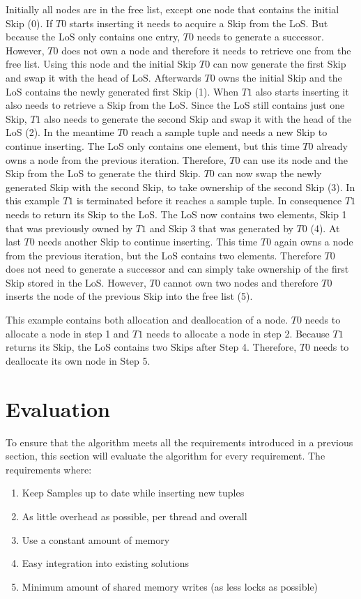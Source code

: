 \documentclass[sigconf,nonacm]{acmart}
\begin{document}
        Initially all nodes are in the free list, except one node that contains the initial Skip (0). If $T0$ starts inserting it needs to acquire a Skip from the LoS. But because the LoS only contains one entry, $T0$ needs to generate a successor. However, $T0$ does not own a node and therefore it needs to retrieve one from the free list. Using this node and the initial Skip $T0$ can now generate the first Skip and swap it with the head of LoS. Afterwards $T0$ owns the initial Skip and the LoS contains the newly generated first Skip (1). When $T1$ also starts inserting it also needs to retrieve a Skip from the LoS. Since the LoS still contains just one Skip, $T1$ also needs to generate the second Skip and swap it with the head of the LoS (2). In the meantime $T0$ reach a sample tuple and needs a new Skip to continue inserting. The LoS only contains one element, but this time $T0$ already owns a node from the previous iteration. Therefore, $T0$ can use its node and the Skip from the LoS to generate the third Skip. $T0$ can now swap the newly generated Skip with the second Skip, to take ownership of the second Skip (3). In this example $T1$ is terminated before it reaches a sample tuple. In consequence $T1$ needs to return its Skip to the LoS. The LoS now contains two elements, Skip 1 that was previously owned by $T1$ and Skip 3 that was generated by $T0$ (4). At last $T0$ needs another Skip to continue inserting. This time $T0$ again owns a node from the previous iteration, but the LoS contains two elements. Therefore $T0$ does not need to generate a successor and can simply take ownership of the first Skip stored in the LoS. However, $T0$ cannot own two nodes and therefore $T0$ inserts the node of the previous Skip into the free list (5).

        This example contains both allocation and deallocation of a node. $T0$ needs to allocate a node in step 1 and $T1$ needs to allocate a node in step 2. Because $T1$ returns its Skip, the LoS contains two Skips after Step 4. Therefore, $T0$ needs to deallocate its own node in Step 5.


    \section{Evaluation}
        To ensure that the algorithm meets all the requirements introduced in a previous section, this section will evaluate the algorithm for every requirement. The requirements where:
        \begin{enumerate}
            \item Keep Samples up to date while inserting new tuples
            \item As little overhead as possible, per thread and overall
            \item Use a constant amount of memory
            \item Easy integration into existing solutions
            \item Minimum amount of shared memory writes (as less locks as possible)
        \end{enumerate}
\end{document}

